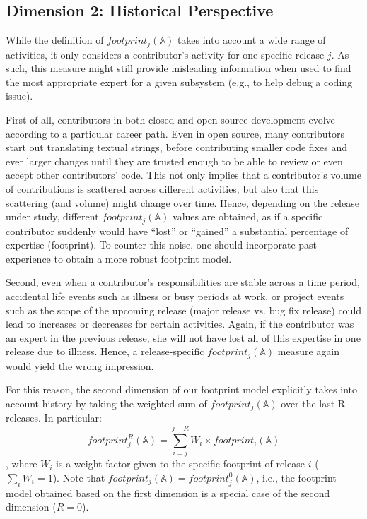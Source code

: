 \subsection{Dimension 2: Historical Perspective}
\label{sec:historical-percpective}


While the definition of $footprint_j(\mathbb{A})$ takes into account a wide range of activities, it only considers a contributor's activity for one specific release $j$. As such, this measure might still provide misleading information when used to find the most appropriate expert for a given subsystem (e.g., to help debug a coding issue).

First of all, contributors in both closed and open source development evolve according to a particular career path. Even in open source, many contributors start out translating textual strings, before contributing smaller code fixes and ever larger changes until they are trusted enough to be able to review or even accept other contributors' code. %
This not only implies that a contributor's volume of contributions is scattered across different activities, but also that this scattering (and volume) might change over time. Hence, depending on the release under study, different $footprint_j(\mathbb{A})$ values are obtained, as if a specific contributor suddenly would have ``lost'' or ``gained'' a substantial percentage of expertise (footprint). To counter this noise, one should incorporate past experience to obtain a more robust footprint model.%

Second, even when a contributor's responsibilities are stable across a time period, accidental life events such as illness or busy periods at work, or project events such as the scope of the upcoming release (major release vs. bug fix release) could lead to increases or decreases for certain activities. Again, if the contributor was an expert in the previous release, she will not have lost all of this expertise in one release due to illness. Hence, a release-specific $footprint_j(\mathbb{A})$ measure again would yield the wrong impression.

For this reason, the second dimension of our footprint model explicitly takes into account history by taking the weighted sum of $footprint_j(\mathbb{A})$ over the last R releases. In particular: $$footprint_j^R(\mathbb{A})=\sum_{i=j}^{j-R} W_i \times footprint_i(\mathbb{A})$$, where $W_i$ is a weight factor given to the specific footprint of release $i$ ($\sum_i W_i = 1$). Note that $footprint_j(\mathbb{A})=footprint_j^0(\mathbb{A})$, i.e., the footprint model obtained based on the first dimension is a special case of the second dimension ($R=0$).

